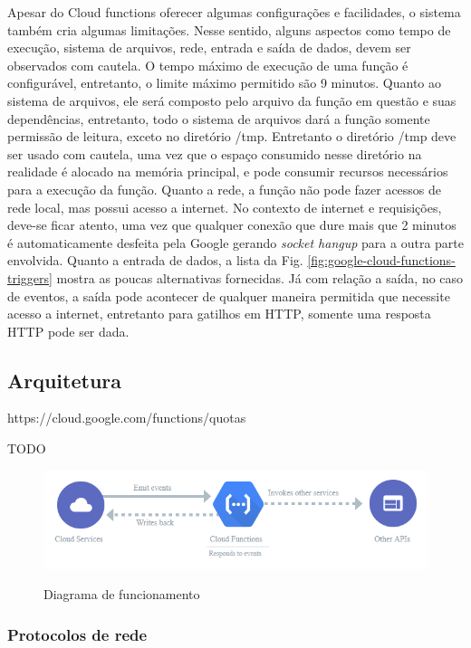 Apesar do Cloud functions oferecer algumas configurações e facilidades, o sistema também cria algumas limitações. Nesse sentido, alguns aspectos como tempo de execução, sistema de arquivos, rede, entrada e saída de dados, devem ser observados com cautela. O tempo máximo de execução de uma função é configurável, entretanto, o limite máximo permitido são 9 minutos. Quanto ao sistema de arquivos, ele será composto pelo arquivo da função em questão e suas dependências, entretanto, todo o sistema de arquivos dará a função somente permissão de leitura, exceto no diretório /tmp. Entretanto o diretório /tmp deve ser usado com cautela, uma vez que o espaço consumido nesse diretório na realidade é alocado na memória principal, e pode consumir recursos necessários para a execução da função. Quanto a rede, a função não pode fazer acessos de rede local, mas possui acesso a internet. No contexto de internet e requisições, deve-se ficar atento, uma vez que qualquer conexão que dure mais que 2 minutos é automaticamente desfeita pela Google gerando \textit{socket hangup} para a outra parte envolvida. Quanto a entrada de dados, a lista da Fig. \ref{fig:google-cloud-functions-triggers} mostra as poucas alternativas fornecidas. Já com relação a saída, no caso de eventos, a saída pode acontecer de qualquer maneira permitida que necessite acesso a internet, entretanto para gatilhos em HTTP, somente uma resposta HTTP pode ser dada.

\subsection{Arquitetura}

https://cloud.google.com/functions/quotas

TODO
\begin{figure}[ht]
	\centering
	\caption{Diagrama de funcionamento}
	\includegraphics[width=12.5cm]{figuras/google-cloud-functions/workflow.png}
	\label{fig:google-cloud-functions-workflow}
\end{figure}

\subsubsection{Protocolos de rede}

